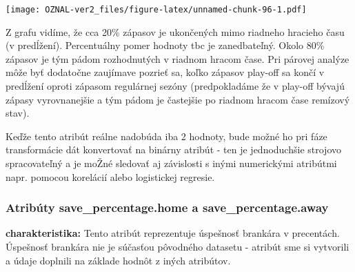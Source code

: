 \documentclass[
]{article}
\newenvironment{Shaded}{\begin{snugshade}}{\end{snugshade}}
\newcommand{\AttributeTok}[1]{\textcolor[rgb]{0.77,0.63,0.00}{#1}}
\newcommand{\DecValTok}[1]{\textcolor[rgb]{0.00,0.00,0.81}{#1}}
\newcommand{\FloatTok}[1]{\textcolor[rgb]{0.00,0.00,0.81}{#1}}
\newcommand{\FunctionTok}[1]{\textcolor[rgb]{0.00,0.00,0.00}{#1}}
\newcommand{\NormalTok}[1]{#1}
\newcommand{\SpecialCharTok}[1]{\textcolor[rgb]{0.00,0.00,0.00}{#1}}
\newcommand{\StringTok}[1]{\textcolor[rgb]{0.31,0.60,0.02}{#1}}
\begin{document}
\begin{Shaded}
\end{Shaded}

\texttt{[image: OZNAL-ver2\_files/figure-latex/unnamed-chunk-96-1.pdf]}

Z grafu vidíme, že cca 20\% zápasov je ukončených mimo riadneho hracieho
času (v predĺžení). Percentuálny pomer hodnoty tbc je zanedbateľný.
Okolo 80\% zápasov je tým pádom rozhodnutých v riadnom hracom čase. Pri
párovej analýze môže byť dodatočne zaujímave pozrieť sa, koľko zápasov
play-off sa končí v predĺžení oproti zápasom regulárnej sezóny
(predpokladáme že v play-off bývajú zápasy vyrovnanejšie a tým pádom je
častejšie po riadnom hracom čase remízový stav).

Keďže tento atribút reálne nadobúda iba 2 hodnoty, bude možné ho pri
fáze transformácie dát konvertovať na binárny atribút - ten je
jednoduchšie strojovo spracovateľný a je moŽné sledovať aj závislosti s
inými numerickými atribútmi napr. pomocou korelácií alebo logistickej
regresie.

\hypertarget{atribuxfaty-save_percentage.home-a-save_percentage.away}{%
\subsubsection{Atribúty save\_percentage.home a
save\_percentage.away}\label{atribuxfaty-save_percentage.home-a-save_percentage.away}}

\textbf{charakteristika:} Tento atribút reprezentuje úspešnosť brankára
v precentách. Úspešnosť brankára nie je súčasťou pôvodného datasetu -
atribút sme si vytvorili a údaje doplnili na základe hodnôt z iných
atribútov.

\begin{Shaded}
\end{Shaded}
\end{document}

